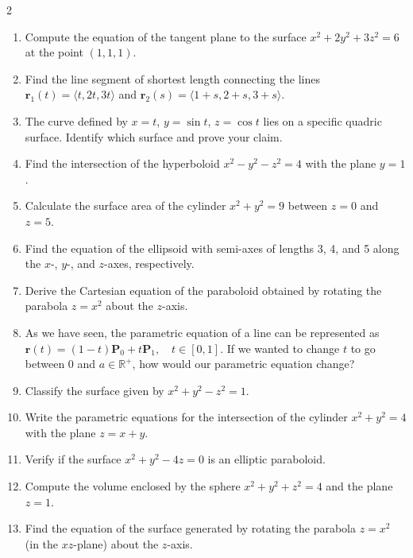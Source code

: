 \begin{multicols}{2}
\begin{enumerate}
    \item Compute the equation of the tangent plane to the surface \( x^2 + 2y^2 + 3z^2 = 6 \) at the point \( (1, 1, 1) \).
    \item Find the line segment of shortest length connecting the lines \( \mathbf{r}_1(t) = \langle t, 2t, 3t \rangle \) and \( \mathbf{r}_2(s) = \langle 1 + s, 2 + s, 3 + s \rangle \).
    \item The curve defined by \( x = t \), \( y = \sin t \), \( z = \cos t \) lies on a specific quadric surface. Identify which surface and prove your claim.
    \item Find the intersection of the hyperboloid \( x^2 - y^2 - z^2 = 4 \) with the plane \( y = 1 \).
    \item Calculate the surface area of the cylinder \( x^2 + y^2 = 9 \) between \( z = 0 \) and \( z = 5 \).
    \item Find the equation of the ellipsoid with semi-axes of lengths 3, 4, and 5 along the \( x \)-, \( y \)-, and \( z \)-axes, respectively.
    \item Derive the Cartesian equation of the paraboloid obtained by rotating the parabola \( z = x^2 \) about the \( z \)-axis.
   \item As we have seen, the parametric equation of a line can be represented as $\mathbf{r}(t) = (1-t)\mathbf{P}_0 + t\mathbf{P}_1, \quad t \in [0,1]$. If we wanted to change $t$ to go between $0$ and $a \in \mathbb{R}^{+}$, how would our parametric equation change?

    \item Classify the surface given by \( x^2 + y^2 - z^2 = 1 \).
    \item Write the parametric equations for the intersection of the cylinder \( x^2 + y^2 = 4 \) with the plane \( z = x + y \).
    \item Verify if the surface \( x^2 + y^2 - 4z = 0 \) is an elliptic paraboloid.
    \item Compute the volume enclosed by the sphere \( x^2 + y^2 + z^2 = 4 \) and the plane \( z = 1 \).
    \item Find the equation of the surface generated by rotating the parabola \( z = x^2 \) (in the \( xz \)-plane) about the \( z \)-axis.

\end{enumerate}

\end{multicols}

